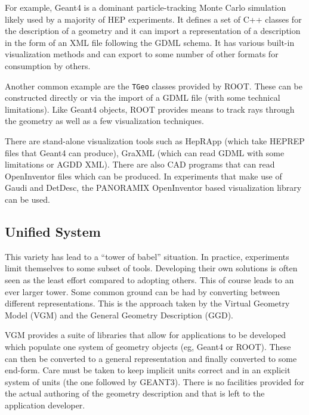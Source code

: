 For example, Geant4 is a dominant particle-tracking Monte Carlo
simulation likely used by a majority of HEP experiments.  It defines a
set of C++ classes for the description of a geometry and it can import
a representation of a description in the form of an XML file following
the GDML schema.  It has various built-in visualization methods and
can export to some number of other formats for consumption by others.

Another common example are the \texttt{TGeo} classes provided by ROOT.
These can be constructed directly or via the import of a GDML file
(with some technical limitations).  Like Geant4 objects, ROOT provides
means to track rays through the geometry as well as a few
visualization techniques.

There are stand-alone visualization tools such as HepRApp (which take
HEPREP files that Geant4 can produce), GraXML (which can read GDML
with some limitations or AGDD XML).  There are also CAD programs that
can read OpenInventor files which can be produced.  In experiments
that make use of Gaudi and DetDesc, the PANORAMIX OpenInventor based
visualization library can be used.

\subsection{Unified System}

This variety has lead to a ``tower of babel'' situation.  In practice,
experiments limit themselves to some subset of tools.  Developing
their own solutions is often seen as the least effort compared to
adopting others.  This of course leads to an ever larger tower.  Some
common ground can be had by converting between different
representations.  This is the approach taken by the Virtual Geometry
Model (VGM)\cite{vgm} and the General Geometry Description (GGD)\cite{gdd}.

VGM provides a suite of libraries that allow for applications to be
developed which populate one system of geometry objects (eg, Geant4 or
ROOT).  These can then be converted to a general representation and
finally converted to some end-form.  Care must be taken to keep
implicit units correct and in an explicit system of units (the one
followed by GEANT3).  There is no facilities provided for the actual
authoring of the geometry description and that is left to the
application developer.

